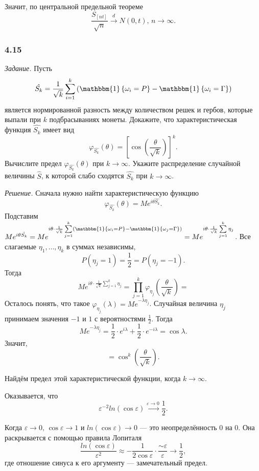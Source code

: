 Значит, по центральной предельной теореме
$$ \frac{S_{ \left[ nt \right] }}{ \sqrt{n}} \overset{d}{ \to } N \left( 0, t \right), \,
  n \to \infty.$$

\subsubsection*{4.15}

\textit{Задание.}
Пусть
$$ \hat{S_k} =
  \frac{1}{ \sqrt{k}}
  \sum \limits_{i = 1}^k \left(
    \mathbbm{1} \left\{ \omega_i = P \right\} - \mathbbm{1} \left\{ \omega_i = \Gamma \right\}
  \right) $$
является нормированной разность между количеством решек и гербов, которые выпали при $k$
подбрасываниях монеты.
Докажите, что характеристическая функция $ \hat{S_k}$ имеет вид
$$ \varphi_{ \hat{S_k}} \left( \theta \right) =
  \left[ \cos \left( \frac{ \theta }{ \sqrt{k}} \right) \right]^k.$$
Вычислите предел $ \varphi_{ \hat{S_k}} \left( \theta \right) $ при $k \to \infty $.
Укажите распределение случайной величины $ \hat{S}$,
к которой слабо сходятся $ \hat{S_k}$ при $k \to \infty $.

\textit{Решение.}
Сначала нужно найти характеристическую функцию
$$ \varphi_{ \hat{S_k}} \left( \theta \right) =
  Me^{i \theta \hat{S_k}}.$$
Подставим
$Me^{i \theta \hat{S_k}} =
  Me^{i\theta\cdot\frac{1}{\sqrt{k}}\sum\limits_{j=1}^k \left(\mathbbm{1}\left\{\omega_i =P\right\}-\mathbbm{1}\left\{\omega_j =\Gamma\right\}\right)}=
  Me^{i \theta \cdot \frac{1}{ \sqrt{k}} \sum \limits_{j = 1}^k \eta_j}$.
Все слагаемые $ \eta_1, \dotsc, \eta_k$ в суммах независимы,
$$P \left( \eta_j = 1 \right) =
  \frac{1}{2} =
  P \left( \eta_j = -1 \right).$$
Тогда
$$Me^{i \theta \cdot \frac{1}{ \sqrt{k}} \sum \limits_{j = 1}^k \eta_j} =
  \prod \limits_{j = 1}^k \varphi_{ \eta_j} \left( \frac{ \theta }{ \sqrt{k}} \right) =$$
Осталось понять, что такое $ \varphi_{ \eta_j} \left( \lambda \right) = Me^{- \lambda \eta_j}$.
Случайная величина $ \eta_j$ принимаем значения $-1$ и $1$ с вероятностями $ \frac{1}{2}$.
Тогда
$$Me^{- \lambda \eta_j} =
  \frac{1}{2} \cdot e^{i \lambda } + \frac{1}{2} \cdot e^{-i \lambda } =
  \cos \lambda.$$
Значит,
$$= \cos^k \left( \frac{ \theta }{ \sqrt{k}} \right).$$

Найдём предел этой характеристической функции, когда $k \to \infty $.

Оказывается, что
$$ \varepsilon^{-2} ln \left( \cos \varepsilon \right) \overset{ \varepsilon \to 0}{ \to }
  \frac{1}{2}.$$

Когда $ \varepsilon \to 0, \, \cos \varepsilon \to 1$ и
$ln \left( \cos \varepsilon \right) \to 0$ --- это неопределённость 0 на 0.
Она раскрывается с помощью правила Лопиталя
$$ \frac{ln \left( \cos \varepsilon \right) }{ \varepsilon^2} \approx
  -\frac{1}{2 \cos \varepsilon } \cdot \frac{ \sim \varepsilon }{ \varepsilon } \to
  \frac{1}{2},$$
где отношение синуса к его аргументу --- замечательный предел.

